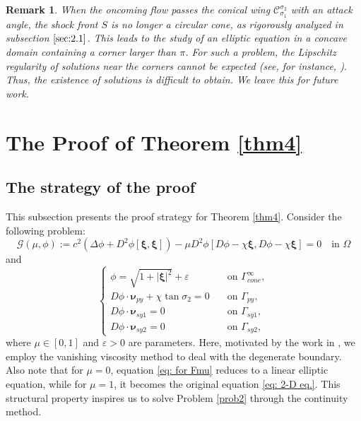 \documentclass[reqno,12pt]{amsart}
\newtheorem{remark}{Remark}[section]
\numberwithin{equation}{section}
\begin{document}
\begin{remark}\label{non-existence}
When the oncoming flow passes the conical wing $\mathcal{C}_{\sigma_1}^{\sigma_2}$ with an attack angle, the shock front $S$ is no longer a circular cone, as rigorously analyzed in subsection $\ref{sec:2.1}$. This leads to the study of an elliptic equation in a concave domain containing a corner larger than $\pi$. For such a problem, the Lipschitz regularity of solutions near the corners cannot be expected (see, for instance, \cite{X20,L26}). Thus, the existence of solutions is difficult to obtain. We leave this for future work.
\end{remark}

\section{The Proof of Theorem \ref{thm4}}\label{sec:3}
\subsection{The strategy of the proof}\label{sec:3.2.2}
This subsection presents the proof strategy for Theorem \ref{thm4}. Consider the following problem:
\begin{equation}\label{eq: for Fmu}
	\mathcal{G}(\mu,\phi):=c^{2}(\Delta\phi+D^{2}\phi[\bm{\xi},\bm{\xi}])-\mu D^{2}\phi[D\phi-\chi\bm{\xi},D\phi-\chi\bm{\xi}]=0\quad\text{in $\Omega$}
\end{equation}
and 
	\begin{equation}\label{eq:nianxing BC}
		\begin{cases}
	\phi=\sqrt{1+|\bm{\xi}|^{2}}+\varepsilon \quad&\text{on $\Gamma_{cone}^{\infty}$},\\ 
			D\phi\cdot\bm{\nu}_{py}+\chi\tan\sigma_2=0\quad&\text{on $\Gamma_{py}$},\\
			D\phi\cdot\bm{\nu}_{sy1}=0\quad&\text{on $\Gamma_{sy1}$},\\
                D\phi\cdot\bm{\nu}_{sy2}=0\quad&\text{on $\Gamma_{sy2}$},	
		\end{cases}
	\end{equation}
where $\mu\in[0,1]$ and $\varepsilon>0$ are parameters. Here, motivated by the work in \cite{Serre09}, we employ the vanishing viscosity method to deal with the degenerate boundary. Also note that for $\mu=0$, equation \eqref{eq: for Fmu} reduces to a linear elliptic equation, while for $\mu=1$, it becomes the original equation \eqref{eq: 2-D eq.}. This structural property inspires us to solve Problem \ref{prob2} through the continuity method. 
\end{document}
